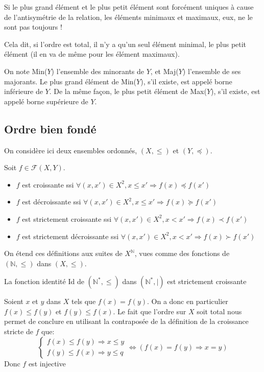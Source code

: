 \documentclass{scrartcl}
\begin{document}
			\rem Si le plus grand élément et le plus petit élément sont forcément uniques
			à cause de l'antisymétrie de la relation, les éléments minimaux et maximaux, eux, ne le sont
			pas toujours !

			\rem Cela dit, si l'ordre est total, il n'y a qu'un seul élément minimal, le plus
			petit élément (il en va de même pour les élément maximaux).

			On note Min($Y$) l'ensemble des minorants de $Y$, et Maj($Y$) l'ensemble de ses majorants.
			Le plus grand élément de Min($Y$), s'il existe, est appelé borne inférieure de $Y$. De la même façon,
			le plus petit élément de Max($Y$), s'il existe, est appelé borne supérieure de $Y$. 

		\subsection{Ordre bien fondé}
			On considère ici deux ensembles ordonnés, $(X,\leq)$ et $(Y,\preceq)$.

			Soit $f \in \mathcal{F}(X,Y)$. 
			\begin{itemize}
				\item $f$ est croissante ssi $\forall (x,x') \in X^2, x \leq x' \Rightarrow f(x) \preceq f(x')$
				\item $f$ est décroissante ssi $\forall (x,x') \in X^2, x \leq x' \Rightarrow f(x) \succeq f(x')$
				\item $f$ est strictement croissante ssi $\forall (x,x') \in X^2, x < x' \Rightarrow f(x) \prec f(x')$
				\item $f$ est strictement décroissante ssi $\forall (x,x') \in X^2, x < x' \Rightarrow f(x) \succ f(x')$
			\end{itemize}

			\rem On étend ces définitions aux suites de $X^\mathbb{N}$, 
			vues comme des fonctions de $(\mathbb{N},\leq)$ dans $(X,\leq)$.

			\exemple La fonction identité Id de $(\mathbb{N}^*,\leq)$ dans $(\mathbb{N}^*,|)$ est strictement croissante
			
			\begin{demo}
				\item Soient $x$ et $y$ dans $X$ tels que $f(x) = f(y)$.
				On a donc en particulier $f(x) \leq f(y)$ et $f(y) \leq f(x)$. 
				Le fait que l'ordre sur $X$ soit total nous permet de conclure
				en utilisant la contraposée de la définition de la croissance stricte de $f$ que:
				\[
					\begin{cases}
						f(x) \leq f(y) \Rightarrow x \leq y \\
						f(y) \leq f(x) \Rightarrow y \leq q
					\end{cases}
					\Leftrightarrow \left(f(x) = f(y) \Rightarrow x=y \right)
				\]
				Donc $f$ est injective
			\end{demo}
\end{document}
